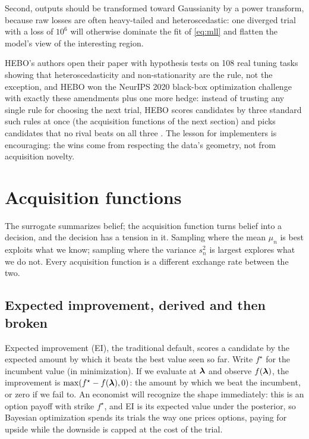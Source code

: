 Second, outputs should be
transformed toward Gaussianity by a power transform, because raw losses are
often heavy-tailed and heteroscedastic: one diverged trial with a loss of
$10^{6}$ will otherwise dominate the fit of \eqref{eq:mll} and flatten the
model's view of the interesting region.

HEBO's authors open their paper
with hypothesis tests on 108 real tuning tasks showing that
heteroscedasticity and non-stationarity are the rule, not the exception,
and HEBO won the NeurIPS 2020 black-box optimization challenge with exactly
these amendments plus one more hedge: instead of trusting any single
rule for choosing the next trial, HEBO scores candidates by three
standard such rules at once (the acquisition functions of the next
section) and picks candidates that no rival beats on all three
\citep{cowenrivers2022hebo, turner2021bayesian}. The lesson for
implementers is encouraging: the wins come from respecting the data's
geometry, not from acquisition novelty.

\section{Acquisition functions}
\label{sec:acquisition}

The surrogate summarizes belief; the acquisition function turns belief into
a decision, and the decision has a tension in it. Sampling where the mean
$\mu_n$ is best exploits what we know; sampling where the variance $s_n^2$
is largest explores what we do not. Every acquisition function is a
different exchange rate between the two.

\subsection{Expected improvement, derived and then broken}

Expected improvement (EI), the traditional default, scores a candidate by
the expected amount by which it beats the best value seen so far. Write
$f^{\star}$ for the incumbent value (in minimization). If we evaluate at
$\bm{\lambda}$ and observe $f(\bm{\lambda})$, the improvement is
$\max(f^{\star} - f(\bm{\lambda}), 0)$: the amount by which we beat the
incumbent, or zero if we fail to. An economist will recognize the shape
immediately: this is an option payoff with strike $f^{\star}$, and EI is
its expected value under the posterior, so Bayesian optimization spends
its trials the way one prices options, paying for upside while the
downside is capped at the cost of the trial.

